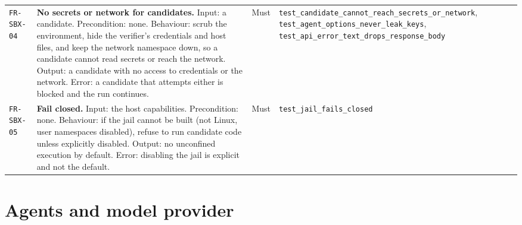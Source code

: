 \begin{longtable}{@{}>{\raggedright\arraybackslash}p{}>{\raggedright\arraybackslash}p{}p{}>{\raggedright\arraybackslash}p{}@{}}
\texttt{FR-SBX-04} & \textbf{No secrets or network for candidates.} Input: a
candidate. Precondition: none. Behaviour: scrub the environment, hide the
verifier's credentials and host files, and keep the network namespace down, so a
candidate cannot read secrets or reach the network. Output: a candidate with no
access to credentials or the network. Error: a candidate that attempts either is
blocked and the run continues. & Must &
\texttt{test\_candidate\_cannot\_reach\_secrets\_or\_network},
\texttt{test\_agent\_options\_never\_leak\_keys},
\texttt{test\_api\_error\_text\_drops\_response\_body} \\
\addlinespace[2pt]

\texttt{FR-SBX-05} & \textbf{Fail closed.} Input: the host capabilities.
Precondition: none. Behaviour: if the jail cannot be built (not Linux, user
namespaces disabled), refuse to run candidate code unless explicitly disabled.
Output: no unconfined execution by default. Error: disabling the jail is explicit
and not the default. & Must & \texttt{test\_jail\_fails\_closed} \\
\bottomrule
\end{longtable}

\section{Agents and model provider}
\label{sec:fr-agent}

